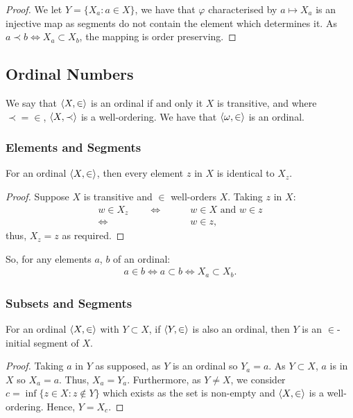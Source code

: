 \begin{proof}
    We let $Y = \{X_a : a \in X\}$, we have that $\varphi$
    characterised by $a \mapsto X_a$ is an injective map
    as segments do not contain the element which determines it.
    As $a \prec b \Leftrightarrow X_a \subset X_b$, the mapping
    is order preserving.
\end{proof}

\subsection{Ordinal Numbers}

We say that $\langle X, \in \rangle$ is an ordinal if and only it
$X$ is transitive, and where $\prec = \in$, 
$\langle X, \prec \rangle$ is a well-ordering. We have that
$\langle \omega, \in \rangle$ is an ordinal.

\subsubsection{Elements and Segments}

For an ordinal $\langle X, \in \rangle$, then every element $z$ in $X$
is identical to $X_z$.

\begin{proof}
    Suppose $X$ is transitive and $\in$ well-orders $X$.
    Taking $z$ in $X$: \begin{align*}
        w \in X_z \qquad
        \Longleftrightarrow \qquad&
        w \in X \text{ and } w \in z \\
        \Longleftrightarrow \qquad&
        w \in z \tag{as $z \subseteq X$},
    \end{align*} thus, $X_z = z$ as required.
\end{proof} 
\noindent
So, for any elements $a$, $b$ of an ordinal: \begin{align*}
    a \in b \Longleftrightarrow a \subset b 
    \Longleftrightarrow X_a \subset X_b.
\end{align*}

\subsubsection{Subsets and Segments}

For an ordinal $\langle X, \in \rangle$ with $Y \subset X$, if $\langle Y, \in \rangle$
is also an ordinal, then $Y$ is an $\in$-initial segment of $X$.

\begin{proof}
    Taking $a$ in $Y$ as supposed, as $Y$ is an ordinal so $Y_a = a$.
    As $Y \subset X$, $a$ is in $X$ so $X_a = a$. Thus, $X_a = Y_a$.
    Furthermore, as $Y \neq X$, we consider 
    $c = \inf\{z \in X : z \notin Y\}$ which exists as the set is
    non-empty and $\langle X, \in \rangle$ is a well-ordering. Hence, $Y = X_c$.
\end{proof}

